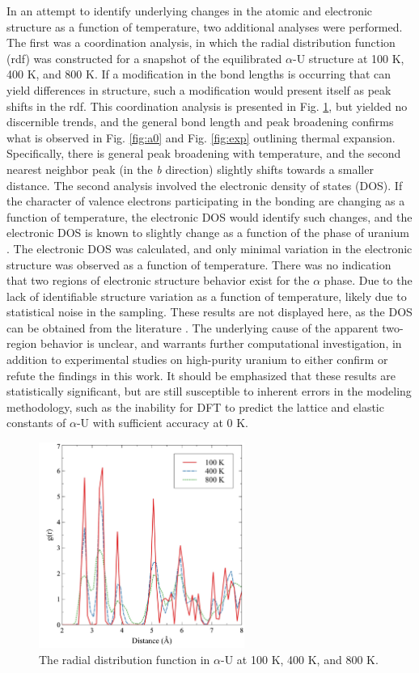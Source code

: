 \documentclass[utf8]{frontiersSCNS} %
\begin{document}
In an attempt to identify underlying changes in the atomic and electronic structure as a function of temperature, two additional analyses were performed. The first was a coordination analysis, in which the radial distribution function (rdf) was constructed for a snapshot of the equilibrated $\alpha$-U structure at 100 K, 400 K, and 800 K. If a modification in the bond lengths is occurring that can yield differences in structure, such a modification would present itself as peak shifts in the rdf. This coordination analysis is presented in Fig. \ref{fig:rdf}, but yielded no discernible trends, and the general bond length and peak broadening confirms what is observed in Fig. \ref{fig:a0} and Fig. \ref{fig:exp} outlining thermal expansion. Specifically, there is general peak broadening with temperature, and the second nearest neighbor peak (in the \textit{b} direction) slightly shifts towards a smaller distance. The second analysis involved the electronic density of states (DOS). If the character of valence electrons participating in the bonding are changing as a function of temperature, the electronic DOS would identify such changes, and the electronic DOS is known to slightly change as a function of the phase of uranium \cite{beeler2013}. The electronic DOS was calculated, and only minimal variation in the electronic structure was observed as a function of temperature. There was no indication that two regions of electronic structure behavior exist for the $\alpha$ phase. Due to the lack of identifiable structure variation as a function of temperature, likely due to statistical noise in the sampling. These results are not displayed here, as the DOS can be obtained from the literature \cite{beeler2013,hood2008}. The underlying cause of the apparent two-region behavior is unclear, and warrants further computational investigation, in addition to experimental studies on high-purity uranium to either confirm or refute the findings in this work. It should be emphasized that these results are statistically significant, but are still susceptible to inherent errors in the modeling methodology, such as the inability for DFT to predict the lattice and elastic constants of $\alpha$-U with sufficient accuracy at 0 K. 

 \begin{figure}[hbt]
	\centering
	\includegraphics[width=0.6\textwidth]{rdfs.jpg}
    \caption{The radial distribution function in $\alpha$-U at 100 K, 400 K, and 800 K. }\label{fig:rdf}
\end{figure}
\end{document}
